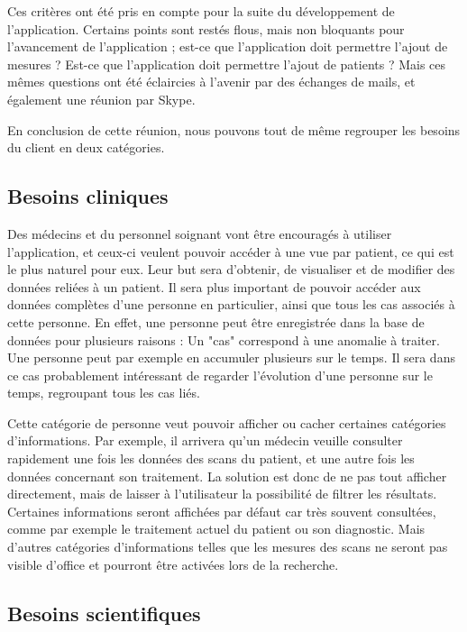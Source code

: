 	Ces critères ont été pris en compte pour la suite du développement de l'application. Certains points sont restés flous, mais non bloquants pour l'avancement de l'application ; est-ce que l'application doit permettre l'ajout de mesures ? Est-ce que l'application doit permettre l'ajout de patients ? Mais ces mêmes questions ont été éclaircies à l'avenir par des échanges de mails, et également une réunion par Skype.

	En conclusion de cette réunion, nous pouvons tout de même regrouper les besoins du client en deux catégories.

	\subsection{Besoins cliniques}

		Des médecins et du personnel soignant vont être encouragés à utiliser l'application, et ceux-ci veulent pouvoir accéder à une vue par patient, ce qui est le plus naturel pour eux. Leur but sera d'obtenir, de visualiser et de modifier des données reliées à un patient. Il sera plus important de pouvoir accéder aux données complètes d'une personne en particulier, ainsi que tous les cas associés à cette personne. En effet, une personne peut être enregistrée dans la base de données pour plusieurs raisons : Un "cas" correspond à une anomalie à traiter. Une personne peut par exemple en accumuler plusieurs sur le temps. Il sera dans ce cas probablement intéressant de regarder l'évolution d'une personne sur le temps, regroupant tous les cas liés.

		Cette catégorie de personne veut pouvoir afficher ou cacher certaines catégories d'informations. Par exemple, il arrivera qu'un médecin veuille consulter rapidement une fois les données des scans du patient, et une autre fois les données concernant son traitement. La solution est donc de ne pas tout afficher directement, mais de laisser à l'utilisateur la possibilité de filtrer les résultats. Certaines informations seront affichées par défaut car très souvent consultées, comme par exemple le traitement actuel du patient ou son diagnostic. Mais d'autres catégories d'informations telles que les mesures des scans ne seront pas visible d'office et pourront être activées lors de la recherche.

	\subsection{Besoins scientifiques}
	
